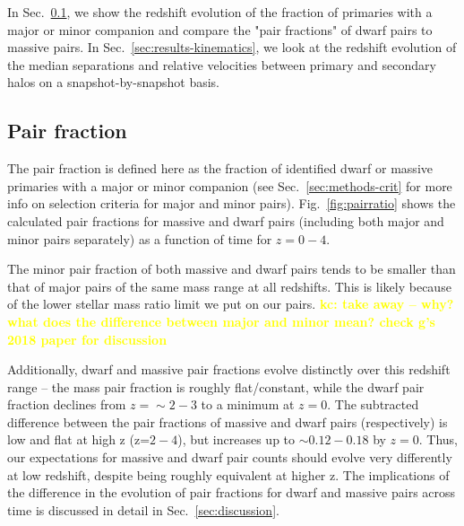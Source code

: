 \documentclass[twocolumn]{aastex631}
\newcommand{\kc}[1]{\textcolor{yellow}{\textbf{kc: #1}} }
\begin{document}
In Sec.~\ref{sec:results-frac}, we show the redshift evolution of the fraction of primaries with a major or minor companion and compare the "pair fractions" of dwarf pairs to massive pairs.
In Sec.~\ref{sec:results-kinematics}, we look at the redshift evolution of the median separations and relative velocities between primary and secondary halos on a snapshot-by-snapshot basis.


\subsection{Pair fraction}\label{sec:results-frac}
The pair fraction is defined here as the fraction of identified dwarf or massive primaries with a major or minor companion (see Sec.~\ref{sec:methods-crit} for more info on selection criteria for major and minor pairs). 
Fig.~\ref{fig:pairratio} shows the calculated pair fractions for massive and dwarf pairs (including both major and minor pairs separately) as a function of time for $z=0-4$. 

The minor pair fraction of both massive and dwarf pairs tends to be smaller than that of major pairs of the same mass range at all redshifts. This is likely because of the lower stellar mass ratio limit we put on our pairs. \kc{take away -- why? what does the difference between major and minor mean? check g's 2018 paper for discussion} 

Additionally, dwarf and massive pair fractions evolve distinctly over this redshift range -- the mass pair fraction is roughly flat/constant, while the dwarf pair fraction declines from $z=\sim 2-3$ to a minimum at $z=0$.  
The subtracted difference between the pair fractions of massive and dwarf pairs (respectively) is low and flat at high z (z=$2-4$), but increases up to $\sim0.12-0.18$ by $z=0$. 
Thus, our expectations for massive and dwarf pair counts should evolve very differently at low redshift, despite being roughly equivalent at higher z. 
The implications of the difference in the evolution of pair fractions for dwarf and massive pairs across time is discussed in detail in Sec.~\ref{sec:discussion}.
\end{document}

